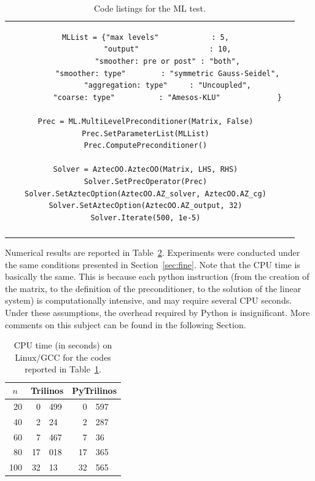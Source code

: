 \documentclass[acmtocl]{acmtrans2m}
\begin{document}
\begin{table}
\begin{tabular}{| c  | c|}
\begin{minipage}{10.5cm}
\begin{verbatim}
MLList = {"max levels"            : 5,
          "output"                : 10,
          "smoother: pre or post" : "both",
          "smoother: type"        : "symmetric Gauss-Seidel",
          "aggregation: type"     : "Uncoupled",
          "coarse: type"          : "Amesos-KLU"             }

Prec = ML.MultiLevelPreconditioner(Matrix, False)
Prec.SetParameterList(MLList)
Prec.ComputePreconditioner()

Solver = AztecOO.AztecOO(Matrix, LHS, RHS)
Solver.SetPrecOperator(Prec)
Solver.SetAztecOption(AztecOO.AZ_solver, AztecOO.AZ_cg)
Solver.SetAztecOption(AztecOO.AZ_output, 32)
Solver.Iterate(500, 1e-5)
\end{verbatim}
    \end{minipage}
    \\
    &  \\
    \hline
  \end{tabular}
  \caption{Code listings for the ML test.}
  \label{tab:code_ml}
\end{table}

Numerical results are reported in Table~\ref{tab:time_ml}.
Experiments were conducted under the same conditions presented in
Section~\ref{sec:fine}.  Note that the CPU time is basically the same.
This is because each python instruction (from the creation of the
matrix, to the definition of the preconditioner, to the solution of
the linear system) is computationally intensive, and may require
several CPU seconds.  Under these assumptions, the overhead required
by Python is insignificant.  More comments on this subject can be
found in the following Section.

\begin{table}
  \begin{center}
    \begin{tabular}{|r|r@{.}l|r@{.}l|}
      \hline
      \tt $n$ & \multicolumn{2}{c|}{Trilinos} &
      \multicolumn{2}{c|}{PyTrilinos} \\
      \hline
       20 &  0&499 &  0&597 \\
       40 &  2&24  &  2&287 \\
       60 &  7&467 &  7&36  \\
       80 & 17&018 & 17&365 \\
      100 & 32&13  & 32&565 \\
      \hline
    \end{tabular}
    \caption{CPU time (in seconds) on Linux/GCC for the codes reported
      in Table~\ref{tab:code_ml}.}
    \label{tab:time_ml}
  \end{center}
\end{table}
\end{document}
